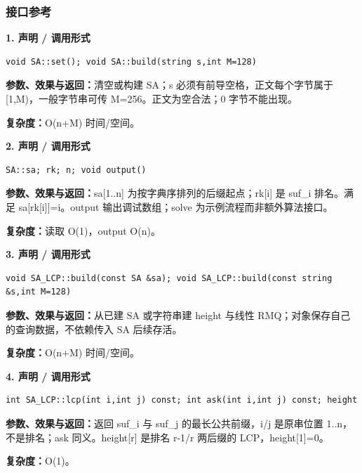 \documentclass[UTF8,a4paper,10pt]{ctexart}
\begin{document}
\subsubsection*{接口参考}
\noindent\begin{minipage}{\textwidth}
\textbf{1. 声明 / 调用形式}
\begin{lstlisting}
void SA::set(); void SA::build(string s,int M=128)
\end{lstlisting}
\textbf{参数、效果与返回：}清空或构建 SA；s 必须有前导空格，正文每个字节属于 [1,M)，一般字节串可传 M=256。正文为空合法；0 字节不能出现。

\textbf{复杂度：}O(n+M) 时间/空间。

\end{minipage}\par\vspace{0.4em}
\noindent\begin{minipage}{\textwidth}
\textbf{2. 声明 / 调用形式}
\begin{lstlisting}
SA::sa; rk; n; void output()
\end{lstlisting}
\textbf{参数、效果与返回：}sa[1..n] 为按字典序排列的后缀起点；rk[i] 是 suf\_i 排名。满足 sa[rk[i]]=i。output 输出调试数组；solve 为示例流程而非额外算法接口。

\textbf{复杂度：}读取 O(1)，output O(n)。

\end{minipage}\par\vspace{0.4em}
\noindent\begin{minipage}{\textwidth}
\textbf{3. 声明 / 调用形式}
\begin{lstlisting}
void SA_LCP::build(const SA &sa); void SA_LCP::build(const string &s,int M=128)
\end{lstlisting}
\textbf{参数、效果与返回：}从已建 SA 或字符串建 height 与线性 RMQ；对象保存自己的查询数据，不依赖传入 SA 后续存活。

\textbf{复杂度：}O(n+M) 时间/空间。

\end{minipage}\par\vspace{0.4em}
\noindent\begin{minipage}{\textwidth}
\textbf{4. 声明 / 调用形式}
\begin{lstlisting}
int SA_LCP::lcp(int i,int j) const; int ask(int i,int j) const; height
\end{lstlisting}
\textbf{参数、效果与返回：}返回 suf\_i 与 suf\_j 的最长公共前缀，i/j 是原串位置 1..n，不是排名；ask 同义。height[r] 是排名 r-1/r 两后缀的 LCP，height[1]=0。

\textbf{复杂度：}O(1)。

\end{minipage}\par\vspace{0.4em}
\end{document}
